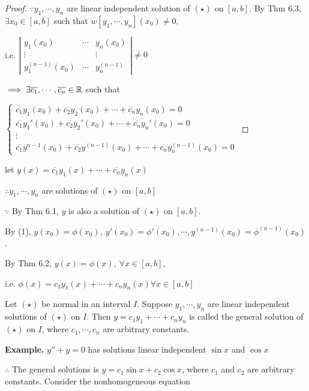\begin{proof}
	$\because y_1,\cdots,y_n$ are linear independent solution of $(\star)$ on $[a,b]$. By Thm 6.3, $\exists x_0 \in [a,b]$ such that $w[y_1,\cdots,y_n](x_0) \neq 0,$
	
	i.e. $ \left| \begin{matrix}
		y_1(x_0) & \cdots & y_n(x_0) \\
		\vdots & & \vdots \\
		y^{(n-1)}_1(x_0) & \cdots & y_n^{(n-1)}
	\end{matrix}\right| \neq 0$
	
	$\implies \exists \overline{c_1},\cdots,\overline{c_n} \in \mathbb{R}$ such that
	
	$\begin{cases}
		\overline{c_1}y_1(x_0) + \overline{c_2}y_2(x_0) + \cdots + \overline{c_n}y_n(x_0) = 0\\
		\overline{c_1}y_1'(x_0) + \overline{c_2}y_2'(x_0) + \cdots + \overline{c_n}y_n'(x_0) = 0\\
		\vdots \\
		\overline{c_1}y^{n-1}(x_0) + \overline{c_2}y^{(n-1)}(x_0) + \cdots + \overline{c_n}y_n^{(n-1)}(x_0) = 0
	\end{cases}$
\end{proof}

let $y(x) = \overline{c_1}y_1(x) + \cdots + \overline{c_n}y_n(x)$

$\therefore y_1,\cdots,y_n$ are solutions of $(\star)$ on $[a,b]$

$\because$ By Thm 6.1, $y$ is also a solution of $(\star)$ on $[a,b]$.

By (1), $y(x_0) = \phi (x_0),~y'(x_0) = \phi'(x_0),\cdots,y^{(n-1)}(x_0) = \phi^{(n-1)}(x_0)$.

By Thm 6.2, $y(x) = \phi(x),~\forall x \in [a,b]$,

i.e. $\phi(x) = c_1y_1(x) + \cdots + c_ny_n(x) \forall x \in [a,b]$

\begin{defn}
	Let $(\star)$ be normal in an interval $I$. Suppose $y_1,\cdots,y_n$ are linear independent solutions of $(\star)$ on $I$. Then $y = c_1y_1 + \cdots + c_ny_n$ is called the general solution of $(\star)$ on $I$, where $c_1,\cdots,c_n$ are arbitrary constants.
\end{defn}

\textbf{Example.} $y'' + y = 0$ has solutions linear independent $\sin x$ and $\cos x$

$\therefore$ The general solutions is $y = c_1\sin x + c_2 \cos x$, where $c_1$ and $c_2$ are arbitrary constants. Consider the nonhomogeneous equation

